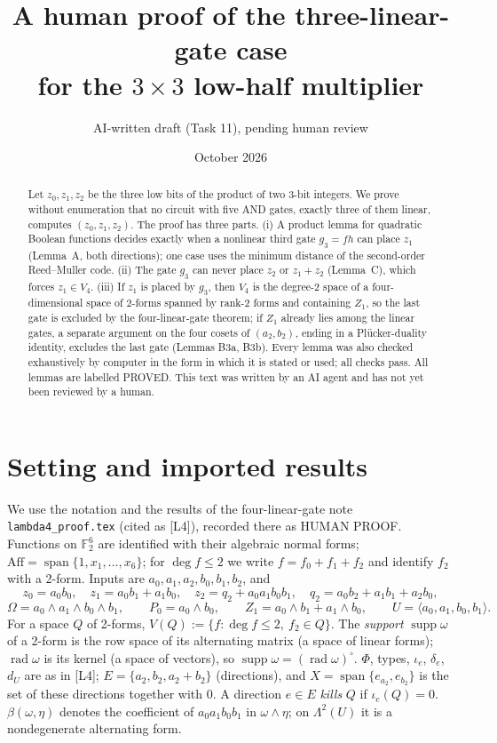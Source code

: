\documentclass[11pt,a4paper]{article}
\title{\bfseries A human proof of the three-linear-gate case\\ for the $3\times 3$ low-half multiplier}
\author{AI-written draft (Task 11), pending human review}
\date{October 2026}
\theoremstyle{plain}
\theoremstyle{definition}
\theoremstyle{remark}
\newcommand{\F}{\mathbb{F}_2}
\newcommand{\Aff}{\mathrm{Aff}}
\newcommand{\Span}{\operatorname{span}}
\newcommand{\supp}{\operatorname{supp}}
\newcommand{\rad}{\operatorname{rad}}
\newcommand{\Lam}{\Lambda^{2}}
\newcommand{\dU}{d_U}
\begin{document}
\maketitle

\begin{abstract}
\noindent
Let $z_0,z_1,z_2$ be the three low bits of the product of two 3-bit integers. We prove without enumeration that no circuit with five AND gates, exactly three of them linear, computes $(z_0,z_1,z_2)$. The proof has three parts. (i) A product lemma for quadratic Boolean functions decides exactly when a nonlinear third gate $g_3=fh$ can place $z_1$ (Lemma~A, both directions); one case uses the minimum distance of the second-order Reed--Muller code. (ii) The gate $g_3$ can never place $z_2$ or $z_1+z_2$ (Lemma~C), which forces $z_1\in V_4$. (iii) If $z_1$ is placed by $g_3$, then $V_4$ is the degree-2 space of a four-dimensional space of 2-forms spanned by rank-2 forms and containing $Z_1$, so the last gate is excluded by the four-linear-gate theorem; if $Z_1$ already lies among the linear gates, a separate argument on the four cosets of $(a_2,b_2)$, ending in a Pl\"ucker-duality identity, excludes the last gate (Lemmas B3a, B3b). Every lemma was also checked exhaustively by computer in the form in which it is stated or used; all checks pass. All lemmas are labelled PROVED. This text was written by an AI agent and has not yet been reviewed by a human.
\end{abstract}

\section{Setting and imported results}

We use the notation and the results of the four-linear-gate note \texttt{lambda4\_proof.tex} (cited as [L4]), recorded there as HUMAN PROOF. Functions on $\F^6$ are identified with their algebraic normal forms; $\Aff=\Span\{1,x_1,\dots,x_6\}$; for $\deg f\le2$ we write $f=f_0+f_1+f_2$ and identify $f_2$ with a 2-form. Inputs are $a_0,a_1,a_2,b_0,b_1,b_2$, and
\[
z_0=a_0b_0,\quad z_1=a_0b_1+a_1b_0,\quad z_2=q_2+a_0a_1b_0b_1,\quad q_2=a_0b_2+a_1b_1+a_2b_0,
\]
\[
\Omega=a_0\wedge a_1\wedge b_0\wedge b_1,\qquad P_0=a_0\wedge b_0,\qquad Z_1=a_0\wedge b_1+a_1\wedge b_0,\qquad U=\langle a_0,a_1,b_0,b_1\rangle .
\]
For a space $Q$ of 2-forms, $V(Q):=\{f:\deg f\le2,\ f_2\in Q\}$. The \emph{support} $\supp\omega$ of a 2-form is the row space of its alternating matrix (a space of linear forms); $\rad\omega$ is its kernel (a space of vectors), so $\supp\omega=(\rad\omega)^{\circ}$. $\Phi$, types, $\iota_e$, $\delta_e$, $\dU$ are as in [L4]; $E=\{a_2,b_2,a_2+b_2\}$ (directions), and $X=\Span\{e_{a_2},e_{b_2}\}$ is the set of these directions together with $0$. A direction $e\in E$ \emph{kills} $Q$ if $\iota_e(Q)=0$. $\beta(\omega,\eta)$ denotes the coefficient of $a_0a_1b_0b_1$ in $\omega\wedge\eta$; on $\Lam(U)$ it is a nondegenerate alternating form.
\end{document}
